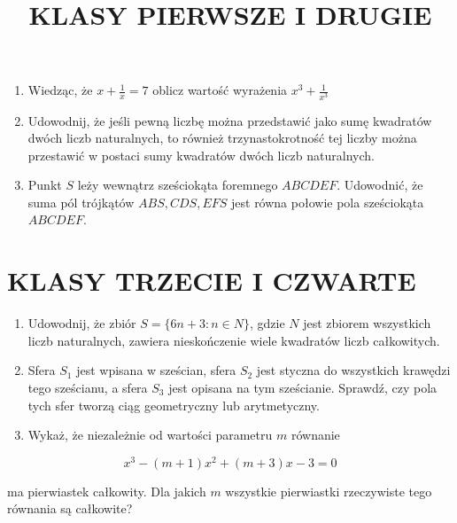 \documentclass[10pt]{article}
\title{KLASY PIERWSZE I DRUGIE }
\author{}
\date{}
\begin{document}
\maketitle
\begin{enumerate}
  \item Wiedząc, że \(x+\frac{1}{x}=7\) oblicz wartość wyrażenia \(x^{3}+\frac{1}{x^{3}}\)
  \item Udowodnij, że jeśli pewną liczbę można przedstawić jako sumę kwadratów dwóch liczb naturalnych, to również trzynastokrotność tej liczby można przestawić w postaci sumy kwadratów dwóch liczb naturalnych.
  \item Punkt \(S\) leży wewnątrz sześciokąta foremnego \(A B C D E F\). Udowodnić, że suma pól trójkątów \(A B S, C D S, E F S\) jest równa połowie pola sześciokąta \(A B C D E F\).
\end{enumerate}

\section*{KLASY TRZECIE I CZWARTE}
\begin{enumerate}
  \item Udowodnij, że zbiór \(S=\{6 n+3: n \in N\}\), gdzie \(N\) jest zbiorem wszystkich liczb naturalnych, zawiera nieskończenie wiele kwadratów liczb całkowitych.
  \item Sfera \(S_{1}\) jest wpisana w sześcian, sfera \(S_{2}\) jest styczna do wszystkich krawędzi tego sześcianu, a sfera \(S_{3}\) jest opisana na tym sześcianie. Sprawdź, czy pola tych sfer tworzą ciąg geometryczny lub arytmetyczny.
  \item Wykaż, że niezależnie od wartości parametru \(m\) równanie
\end{enumerate}

\[
x^{3}-(m+1) x^{2}+(m+3) x-3=0
\]

ma pierwiastek całkowity. Dla jakich \(m\) wszystkie pierwiastki rzeczywiste tego równania są całkowite?
\end{document}
